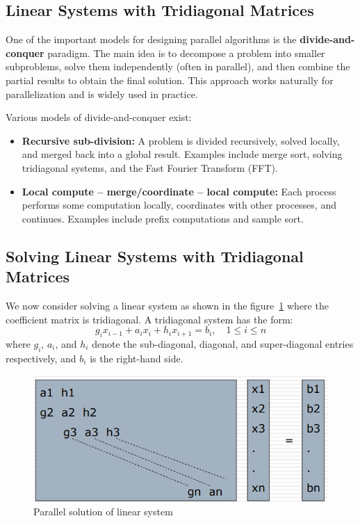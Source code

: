\documentclass[12pt]{book}
\begin{document}
\subsection{Linear Systems with Tridiagonal Matrices}
One of the important models for designing parallel algorithms is the \textbf{divide-and-conquer} paradigm. The main idea is to decompose a problem into smaller subproblems, solve them independently (often in parallel), and then combine the partial results to obtain the final solution. This approach works naturally for parallelization and is widely used in practice.  

Various models of divide-and-conquer exist:
\begin{itemize}
    \item \textbf{Recursive sub-division:}  
    A problem is divided recursively, solved locally, and merged back into a global result.  
    Examples include merge sort, solving tridiagonal systems, and the Fast Fourier Transform (FFT).
    
    \item \textbf{Local compute -- merge/coordinate -- local compute:}  
    Each process performs some computation locally, coordinates with other processes, and continues.  
    Examples include prefix computations and sample sort.
\end{itemize}

\subsection*{Solving Linear Systems with Tridiagonal Matrices}

We now consider solving a linear system as shown in the figure~\ref{fig:llsolLS} where the coefficient matrix is tridiagonal. A tridiagonal system has the form:
\[
g_i x_{i-1} + a_i x_i + h_i x_{i+1} = b_i, \quad 1 \leq i \leq n
\]
where $g_i$, $a_i$, and $h_i$ denote the sub-diagonal, diagonal, and super-diagonal entries respectively, and $b_i$ is the right-hand side.
\begin{figure}[ht]
    \centering
    \includegraphics[width=0.5\linewidth]{images/lltridiagexamp.png}
    \caption{Parallel solution of linear system}
    \label{fig:llsolLS}
\end{figure}
\end{document}
